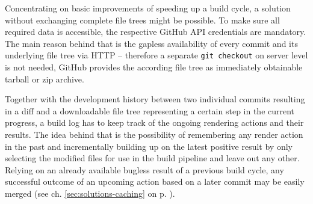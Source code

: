 Concentrating on basic improvements of speeding up a build cycle, a solution without exchanging complete file trees might be possible. To make sure all required data is accessible, the respective GitHub API credentials are mandatory. The main reason behind that is the gapless availability of every commit and its underlying file tree via HTTP -- therefore a separate \texttt{git checkout} on server level is not needed, GitHub provides the according file tree as immediately obtainable tarball or zip archive.

Together with the development history between two individual commits resulting in a diff and a downloadable file tree representing a certain step in the current progress, a build log has to keep track of the ongoing rendering actions and their results. The idea behind that is the possibility of remembering any render action in the past and incrementally building up on the latest positive result by only selecting the modified files for use in the build pipeline and leave out any other. Relying on an already available bugless result of a previous build cycle, any successful outcome of an upcoming action based on a later commit may be easily merged (see ch. \ref{sec:solutions-caching} on p. \pageref{sec:solutions-caching}).
